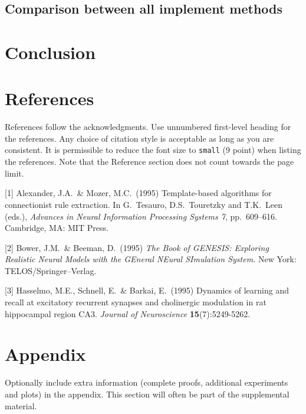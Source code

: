\documentclass{article}
\begin{document}
\subsection{Comparison between all implement methods}



\section{Conclusion}

\section*{References}


References follow the acknowledgments. Use unnumbered first-level heading for
the references. Any choice of citation style is acceptable as long as you are
consistent. It is permissible to reduce the font size to \verb+small+ (9 point)
when listing the references.
Note that the Reference section does not count towards the page limit.
\medskip


{
\small


[1] Alexander, J.A.\ \& Mozer, M.C.\ (1995) Template-based algorithms for
connectionist rule extraction. In G.\ Tesauro, D.S.\ Touretzky and T.K.\ Leen
(eds.), {\it Advances in Neural Information Processing Systems 7},
pp.\ 609--616. Cambridge, MA: MIT Press.


[2] Bower, J.M.\ \& Beeman, D.\ (1995) {\it The Book of GENESIS: Exploring
  Realistic Neural Models with the GEneral NEural SImulation System.}  New York:
TELOS/Springer--Verlag.


[3] Hasselmo, M.E., Schnell, E.\ \& Barkai, E.\ (1995) Dynamics of learning and
recall at excitatory recurrent synapses and cholinergic modulation in rat
hippocampal region CA3. {\it Journal of Neuroscience} {\bf 15}(7):5249-5262.
}






\appendix


\section{Appendix}


Optionally include extra information (complete proofs, additional experiments and plots) in the appendix.
This section will often be part of the supplemental material.
\end{document}
